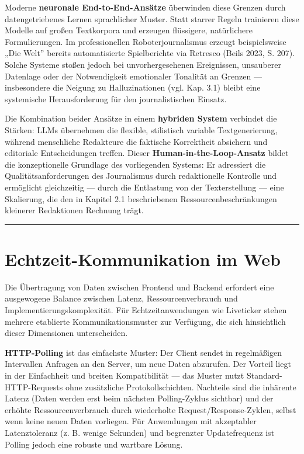 Moderne \textbf{neuronale End-to-End-Ansätze} überwinden diese Grenzen
durch datengetriebenes Lernen sprachlicher Muster. Statt starrer Regeln
trainieren diese Modelle auf großen Textkorpora und erzeugen flüssigere,
natürlichere Formulierungen. Im professionellen Roboterjournalismus
erzeugt beispielsweise „Die Welt'' bereits automatisierte Spielberichte
via Retresco (Beils 2023, S. 207). Solche Systeme stoßen jedoch bei
unvorhergesehenen Ereignissen, unsauberer Datenlage oder der
Notwendigkeit emotionaler Tonalität an Grenzen --- insbesondere die
Neigung zu Halluzinationen (vgl. Kap. 3.1) bleibt eine systemische
Herausforderung für den journalistischen Einsatz.

Die Kombination beider Ansätze in einem \textbf{hybriden System}
verbindet die Stärken: LLMs übernehmen die flexible, stilistisch
variable Textgenerierung, während menschliche Redakteure die faktische
Korrektheit absichern und editoriale Entscheidungen treffen. Dieser
\textbf{Human-in-the-Loop-Ansatz} bildet die konzeptionelle Grundlage
des vorliegenden Systems: Er adressiert die Qualitätsanforderungen des
Journalismus durch redaktionelle Kontrolle und ermöglicht gleichzeitig
--- durch die Entlastung von der Texterstellung --- eine Skalierung, die
den in Kapitel 2.1 beschriebenen Ressourcenbeschränkungen kleinerer
Redaktionen Rechnung trägt.

\begin{center}\rule{0.5\linewidth}{0.5pt}\end{center}

\section{Echtzeit-Kommunikation im
Web}\label{echtzeit-kommunikation-im-web}

Die Übertragung von Daten zwischen Frontend und Backend erfordert eine
ausgewogene Balance zwischen Latenz, Ressourcenverbrauch und
Implementierungskomplexität. Für Echtzeitanwendungen wie Liveticker
stehen mehrere etablierte Kommunikationsmuster zur Verfügung, die sich
hinsichtlich dieser Dimensionen unterscheiden.

\textbf{HTTP-Polling} ist das einfachste Muster: Der Client sendet in
regelmäßigen Intervallen Anfragen an den Server, um neue Daten
abzurufen. Der Vorteil liegt in der Einfachheit und breiten
Kompatibilität --- das Muster nutzt Standard-HTTP-Requests ohne
zusätzliche Protokollschichten. Nachteile sind die inhärente Latenz
(Daten werden erst beim nächsten Polling-Zyklus sichtbar) und der
erhöhte Ressourcenverbrauch durch wiederholte Request/Response-Zyklen,
selbst wenn keine neuen Daten vorliegen. Für Anwendungen mit akzeptabler
Latenztoleranz (z. B. wenige Sekunden) und begrenzter Updatefrequenz ist
Polling jedoch eine robuste und wartbare Lösung.

